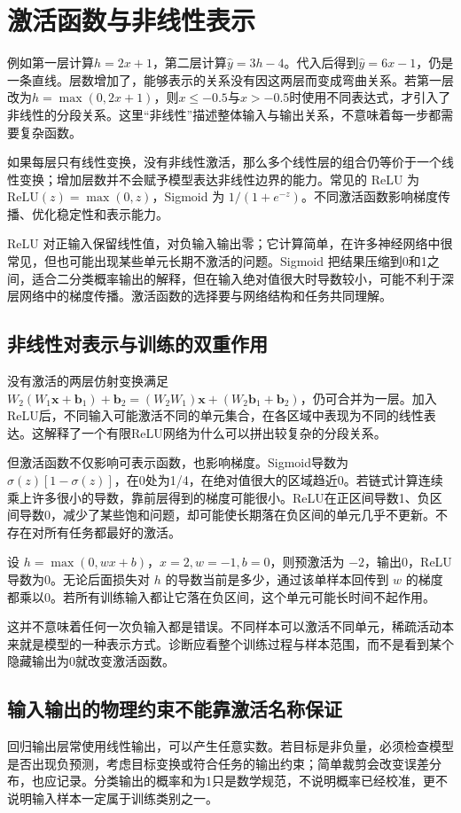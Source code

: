 \section{激活函数与非线性表示}

例如第一层计算$h=2x+1$，第二层计算$\hat y=3h-4$。代入后得到$\hat y=6x-1$，仍是一条直线。层数增加了，能够表示的关系没有因这两层而变成弯曲关系。若第一层改为$h=\max(0,2x+1)$，则$x\leq-0.5$与$x>-0.5$时使用不同表达式，才引入了非线性的分段关系。这里“非线性”描述整体输入与输出关系，不意味着每一步都需要复杂函数。

如果每层只有线性变换，没有非线性激活，那么多个线性层的组合仍等价于一个线性变换；增加层数并不会赋予模型表达非线性边界的能力。常见的 ReLU 为 $\mathrm{ReLU}(z)=\max(0,z)$，Sigmoid 为 $1/(1+e^{-z})$。不同激活函数影响梯度传播、优化稳定性和表示能力。

ReLU 对正输入保留线性值，对负输入输出零；它计算简单，在许多神经网络中很常见，但也可能出现某些单元长期不激活的问题。Sigmoid 把结果压缩到0和1之间，适合二分类概率输出的解释，但在输入绝对值很大时导数较小，可能不利于深层网络中的梯度传播。激活函数的选择要与网络结构和任务共同理解。

\subsection{非线性对表示与训练的双重作用}
没有激活的两层仿射变换满足 $W_2(W_1\mathbf x+\mathbf b_1)+\mathbf b_2=(W_2W_1)\mathbf x+(W_2\mathbf b_1+\mathbf b_2)$，仍可合并为一层。加入ReLU后，不同输入可能激活不同的单元集合，在各区域中表现为不同的线性表达。这解释了一个有限ReLU网络为什么可以拼出较复杂的分段关系。

但激活函数不仅影响可表示函数，也影响梯度。Sigmoid导数为 $\sigma(z)[1-\sigma(z)]$，在0处为1/4，在绝对值很大的区域趋近0。若链式计算连续乘上许多很小的导数，靠前层得到的梯度可能很小。ReLU在正区间导数1、负区间导数0，减少了某些饱和问题，却可能使长期落在负区间的单元几乎不更新。不存在对所有任务都最好的激活。

设 $h=\max(0,wx+b)$，$x=2,w=-1,b=0$，则预激活为 $-2$，输出0，ReLU导数为0。无论后面损失对 $h$ 的导数当前是多少，通过该单样本回传到 $w$ 的梯度都乘以0。若所有训练输入都让它落在负区间，这个单元可能长时间不起作用。

这并不意味着任何一次负输入都是错误。不同样本可以激活不同单元，稀疏活动本来就是模型的一种表示方式。诊断应看整个训练过程与样本范围，而不是看到某个隐藏输出为0就改变激活函数。

\subsection{输入输出的物理约束不能靠激活名称保证}
回归输出层常使用线性输出，可以产生任意实数。若目标是非负量，必须检查模型是否出现负预测，考虑目标变换或符合任务的输出约束；简单裁剪会改变误差分布，也应记录。分类输出的概率和为1只是数学规范，不说明概率已经校准，更不说明输入样本一定属于训练类别之一。


